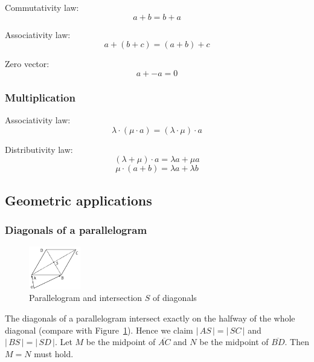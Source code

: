 \documentclass[a4paper,landscape,twocolumn]{article}
\newcommand\card[1]{\left|\,#1\,\right|}
\begin{document}
Commutativity law:
\[ a + b = b + a \]

Associativity law:
\[ a + (b + c) = (a + b) + c \]

Zero vector:
\[ a + -a = 0 \]

\subsubsection{Multiplication}

Associativity law:
\[ \lambda \cdot (\mu \cdot a) = (\lambda \cdot \mu) \cdot a \]

Distributivity law:
\[ (\lambda + \mu) \cdot a = \lambda a + \mu a \]
\[ \mu \cdot (a + b) = \lambda a + \lambda b \]

\subsection{Geometric applications}
\subsubsection{Diagonals of a parallelogram}
%
\begin{figure}[!h]
  \begin{center}
    \includegraphics[width=0.2\textwidth]{img/parallelogram.pdf}
    \caption{Parallelogram and intersection $S$ of diagonals}
    \label{img:parallelogram}
  \end{center}
\end{figure}

The diagonals of a parallelogram intersect exactly on the halfway of the whole diagonal (compare with Figure~\ref{img:parallelogram}).
Hence we claim $\card{AS} = \card{SC}$ and $\card{BS} = \card{SD}$.
Let $M$ be the midpoint of $\overline{AC}$ and $N$ be the midpoint of $\overline{BD}$.
Then $M = N$ must hold.
\end{document}
